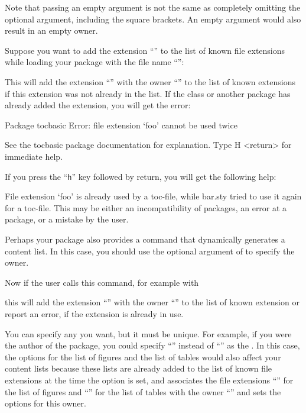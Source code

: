 Note that passing an empty  argument is not
the same as completely omitting the optional argument, including the square
brackets. An empty argument would also result in an empty owner.
\begin{Example}
  Suppose you want to add the extension ``'' to the list of known
  file extensions while loading your package with the file name
  ``'':
\begin{lstcode}
\end{lstcode}%
  This will add the extension ``'' with the owner
  ``'' to the list of known extensions if this extension was
  not already in the list. If the class or another package has already added
  the extension, you will get the error:
\begin{lstoutput}
  Package tocbasic Error: file extension `foo' cannot be used twice

  See the tocbasic package documentation for explanation.
  Type  H <return>  for immediate help.
\end{lstoutput}
  If you press the ``\texttt{h}'' key followed by return, you will get the
  following help:
\begin{lstoutput}
  File extension `foo' is already used by a toc-file, while bar.sty
  tried to use it again for a toc-file.
  This may be either an incompatibility of packages, an error at a package,
  or a mistake by the user.
\end{lstoutput}

  Perhaps your package also provides a command that dynamically generates a
  content list. In this case, you should use the optional argument of
   to specify the owner.
\begin{lstcode}
  \newcommand*{\createnewlistofsomething}[1]{%
    \addtotoclist[bar.sty]{#1}%
  }
\end{lstcode}
  Now if the user calls this command, for example with
\begin{lstcode}
\end{lstcode}
  this will add the extension ``'' with the owner
  ``'' to the list of known extension or report an error, if
  the extension is already in use.
\end{Example}
You can specify any  you want, but it must be unique. For
example, if you were the author of the  package, you could
specify ``'' instead of ``'' as the
. In this case, the \KOMAScript{}
options%
 for the list of figures and the list of
tables would also affect your content lists because these lists are already
added to the list of known file extensions at the time the option is set, and
\KOMAScript{} associates the file extensions ``'' for the list of
figures and ``'' for the list of tables with the owner
``'' and sets the options for this owner.

